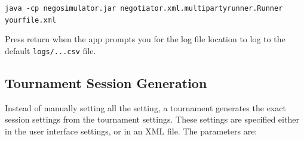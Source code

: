 \documentclass[]{article}
\begin{document}
\vspace{0.5cm}
\verb|java -cp negosimulator.jar negotiator.xml.multipartyrunner.Runner yourfile.xml|
\vspace{0.5cm}

Press return when the app prompts you for the log file location to log to  the default \verb|logs/...csv| file.

\subsection{Tournament Session Generation}\label{sec:sessiongeneration}
Instead of manually setting all the setting, a tournament generates the exact session settings from the tournament settings. These
settings are specified either in the user interface settings, or in an XML file. The parameters are:
\end{document}
